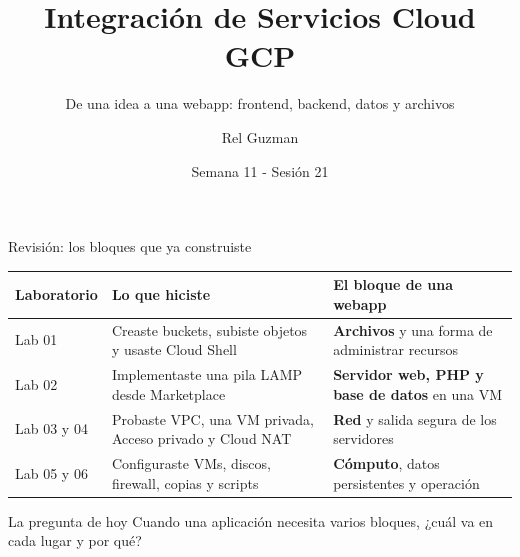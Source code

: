 \documentclass[aspectratio=169,10pt,c]{beamer}
\title{Integración de Servicios Cloud GCP}
\subtitle{De una idea a una webapp: frontend, backend, datos y archivos}
\date{Semana 11 - Sesión 21}
\author{Rel Guzman}
\begin{document}
{\maketitle}

\begin{frame}{Revisión: los bloques que ya construiste}
\renewcommand{\arraystretch}{1.28}
\centering\small
\begin{tabular}{@{}p{3.0cm}p{5.0cm}p{5.0cm}@{}}
\toprule
\textbf{Laboratorio} & \textbf{Lo que hiciste} & \textbf{El bloque de una webapp}\\
\midrule
Lab 01 & Creaste buckets, subiste objetos y usaste Cloud Shell & \textbf{Archivos} y una forma de administrar recursos\\
Lab 02 & Implementaste una pila LAMP desde Marketplace & \textbf{Servidor web, PHP y base de datos} en una VM\\
Lab 03 y 04 & Probaste VPC, una VM privada, Acceso privado y Cloud NAT & \textbf{Red} y salida segura de los servidores\\
Lab 05 y 06 & Configuraste VMs, discos, firewall, copias y scripts & \textbf{Cómputo}, datos persistentes y operación\\
\bottomrule
\end{tabular}
\par\vspace{3mm}
\begin{alertblock}{La pregunta de hoy}
\small Cuando una aplicación necesita varios bloques, ¿cuál va en cada lugar y por qué?
\end{alertblock}
\end{frame}
\end{document}
